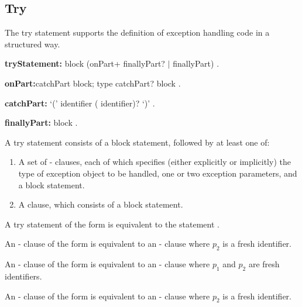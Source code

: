 \documentclass{article}
\begin{document}
\subsection{Try}

\LMHash{}
The try statement supports the definition of exception handling code in a structured way.

\begin{grammar}
{\bf tryStatement:}\TRY{} block (onPart+ finallyPart? $|$ finallyPart)
  .

{\bf onPart:}catchPart block;
  \ON{} type catchPart? block
  .

{\bf catchPart:}\CATCH{} `(' identifier (\gcomma{} identifier)? `)'
  .

{\bf finallyPart:}\FINALLY{} block
  .
\end{grammar}

\LMHash{}
A try statement consists of a block statement, followed by at least one of:
\begin{enumerate}
\item
A set of \ON{}-\CATCH{} clauses, each of which specifies (either explicitly or implicitly) the type of exception object to be handled, one or two exception parameters, and a block statement.
\item
A \FINALLY{} clause, which consists of a block statement.
\end{enumerate}


\LMHash{}
A try statement of the form  is equivalent to the statement .

\LMHash{}
An \ON{}-\CATCH{} clause of the form  is equivalent to an \ON{}-\CATCH{} clause  where $p_2$ is a fresh identifier.

\LMHash{}
An \ON{}-\CATCH{} clause of the form  is equivalent to an \ON{}-\CATCH{} clause  where $p_1$ and $p_2$ are fresh identifiers.

\LMHash{}
An \ON{}-\CATCH{} clause of the form  is equivalent to an \ON{}-\CATCH{} clause  where $p_2$ is a fresh identifier.
\end{document}
